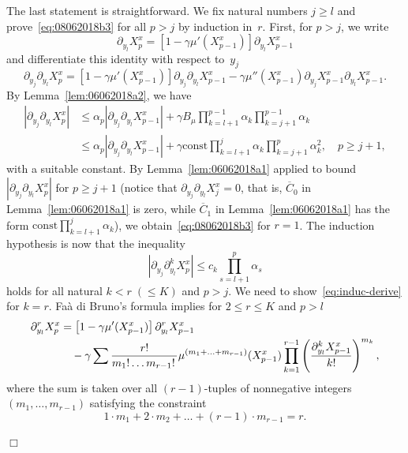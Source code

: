 \documentclass[bj]{imsart}
\newcommand{\proofendsign}{$\Box$}
\newenvironment{proof}{{\noindent \bf Proof }}
 {{\hspace*{\fill}\proofendsign\par\bigskip}}
\newcommand*{\const}{\mathrm{const}}
\newcommand*{\ol}{\overline}
\begin{document}
\begin{proof}
The last statement is straightforward.
We fix natural numbers $j\ge l$ and prove~\eqref{eq:08062018b3}
for all $p>j$ by induction in~$r$.
First, for $p>j$, we write
$$
\partial_{y_{l}}X^x_{p}
=\left[1-\gamma\mu'(X^x_{p-1})\right]\partial_{y_{l}}X^x_{p-1}
$$
and differentiate this identity with respect to~$y_j$
$$
\partial_{y_{j}}\partial_{y_{l}}X^x_{p}
=\left[1-\gamma\mu'(X^x_{p-1})\right]\partial_{y_{j}}\partial_{y_{l}}X^x_{p-1}-\gamma\mu''(X^x_{p-1})\partial_{y_{j}}X^x_{p-1}\partial_{y_{l}}X^x_{p-1}.
$$
By Lemma~\ref{lem:06062018a2}, we have
\begin{align*}
|\partial_{y_{j}}\partial_{y_{l}}X^x_{p}|
&\le\alpha_p|\partial_{y_{j}}\partial_{y_{l}}X^x_{p-1}|
+\gamma
B_\mu
\prod_{k=l+1}^{p-1}\alpha_k
\prod_{k=j+1}^{p-1}\alpha_k\\
&\le\alpha_p|\partial_{y_{j}}\partial_{y_{l}}X^x_{p-1}|
+\gamma
\const
\prod_{k=l+1}^{j}\alpha_k
\prod_{k=j+1}^{p}\alpha_k^2,
\quad p\ge j+1,
\end{align*}
with a suitable constant.
By Lemma~\ref{lem:06062018a1} applied
to bound $|\partial_{y_{j}}\partial_{y_{l}}X^x_{p}|$
for $p\ge j+1$
(notice that $\partial_{y_j}\partial_{y_l}X^x_j=0$, that is,
$\ol C_0$ in Lemma~\ref{lem:06062018a1} is zero,
while $\ol C_1$ in Lemma~\ref{lem:06062018a1}
has the form $\const\prod_{k=l+1}^j \alpha_k$),
we obtain~\eqref{eq:08062018b3} for $r=1$.
The induction hypothesis is now that the inequality
\begin{equation}\label{eq:induc-derive}
\left|\partial_{y_{j}}\partial_{y_{l}}^{k}X^x_{p}\right|
\leq c_{k}\prod_{s=l+1}^{p}\alpha_{s}
\end{equation}
holds for all natural $k<r\;(\le K)$ and $p>j$.
We need to show~\eqref{eq:induc-derive} for $k=r$.
Fa\`a di Bruno's formula implies for $2\le r\le K$ and $p>l$
\begin{align}
\partial_{y_{l}}^{r}X^x_{p}
&=\left[1-\gamma\mu'(X^x_{p-1})\right]\partial_{y_{l}}^{r}X^x_{p-1}
\label{eq:08062018a1}\\
&\hspace{1em}-\gamma\sum\frac{r!}{m_{1}!\ldots m_{r-1}!\,}\mu^{(m_{1}+\ldots+m_{r-1})}(X^x_{p-1})\prod_{k=1}^{r-1}\left(\frac{\partial_{y_{l}}^{k}X^x_{p-1}}{k!}\right)^{m_{k}},
\notag
\end{align}
where the sum is taken over all $(r-1)$-tuples of nonnegative integers
$(m_{1},\ldots,m_{r-1})$ satisfying the constraint
\begin{equation}\label{eq:09062018a1}
1\cdot m_{1}+2\cdot m_{2}+\ldots+(r-1)\cdot m_{r-1}=r.

\end{equation}
\end{proof}
\end{document}
